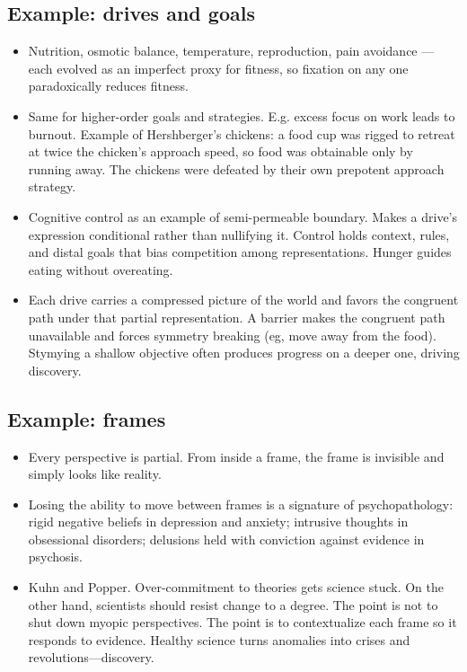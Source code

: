 \documentclass[11pt]{article}
\begin{document}
\subsection*{Example: drives and goals}

\begin{itemize}
  \item Nutrition, osmotic balance, temperature, reproduction, pain avoidance --- each evolved as an imperfect proxy for fitness, so fixation on any one paradoxically reduces fitness. 
  \item Same for higher-order goals and strategies. E.g. excess focus on work leads to burnout. Example of Hershberger's chickens: a food cup was rigged to retreat at twice the chicken's approach speed, so food was obtainable only by running away. The chickens were defeated by their own prepotent approach strategy.
  \item Cognitive control as an example of semi-permeable boundary. Makes a drive's expression conditional rather than nullifying it. Control holds context, rules, and distal goals that bias competition among representations. Hunger guides eating without overeating.
  \item Each drive carries a compressed picture of the world and favors the congruent path under that partial representation. A barrier makes the congruent path unavailable and forces symmetry breaking (eg, move away from the food). Stymying a shallow objective often produces progress on a deeper one, driving discovery.
\end{itemize}

\subsection*{Example: frames}

\begin{itemize}
  \item Every perspective is partial. From inside a frame, the frame is invisible and simply looks like reality.
  \item Losing the ability to move between frames is a signature of psychopathology: rigid negative beliefs in depression and anxiety; intrusive thoughts in obsessional disorders; delusions held with conviction against evidence in psychosis.
  \item Kuhn and Popper. Over-commitment to theories gets science stuck. On the other hand, scientists should resist change to a degree. The point is not to shut down myopic perspectives. The point is to contextualize each frame so it responds to evidence. Healthy science turns anomalies into crises and revolutions---discovery.
\end{itemize}
\end{document}
